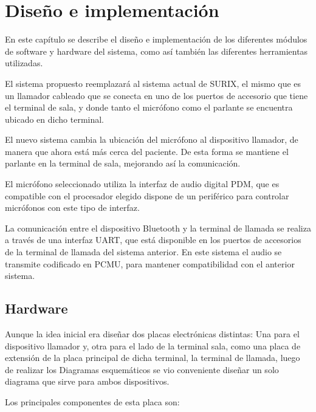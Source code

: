 \chapter{Diseño e implementación} %

En este capítulo se describe el diseño e implementación de los diferentes módulos de software y hardware del sistema, como así también las diferentes herramientas utilizadas.

El sistema propuesto reemplazará al sistema actual de SURIX, el mismo que es un llamador cableado que se conecta en uno de los puertos de accesorio que tiene el terminal de sala, y donde tanto el micrófono como el parlante se encuentra ubicado en dicho terminal.

El nuevo sistema cambia la ubicación del micrófono al dispositivo llamador, de manera que ahora está más cerca del paciente. De esta forma se mantiene el parlante en la terminal de sala, mejorando así la comunicación.

El micrófono seleccionado utiliza la interfaz de audio digital PDM, que es compatible con el procesador elegido dispone de un periférico para controlar micrófonos con este tipo de interfaz.

La comunicación entre el dispositivo Bluetooth y la terminal de llamada se realiza a  través de una interfaz UART, que está disponible en los puertos de accesorios de la terminal de llamada del sistema anterior.
En este sistema el audio se transmite codificado en PCMU, para mantener compatibilidad con el anterior sistema.


\section{Hardware}

Aunque la idea inicial era diseñar dos placas electrónicas distintas: Una para el dispositivo llamador y, otra para el lado de la terminal sala, como una placa de extensión de la placa principal de dicha terminal, la terminal de llamada, luego de realizar los Diagramas esquemáticos se vio conveniente diseñar un solo diagrama que sirve para ambos dispositivos. 

Los principales componentes de esta placa son:

